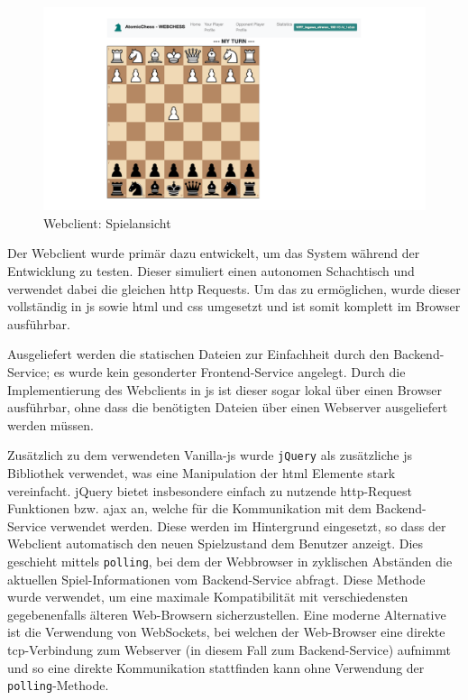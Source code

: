 \begin{figure}
\centering
\includegraphics{images/ATC_webclient.png}
\caption{Webclient: Spielansicht \label{ATC_webclient}}
\end{figure}

Der Webclient wurde primär dazu entwickelt, um das System während der
Entwicklung zu testen. Dieser simuliert einen autonomen Schachtisch und
verwendet dabei die gleichen \gls{http} Requests. Um das zu ermöglichen,
wurde dieser vollständig in \gls{js} sowie \gls{html} und \gls{css}
umgesetzt und ist somit komplett im Browser ausführbar.

Ausgeliefert werden die statischen Dateien zur Einfachheit durch den
Backend-Service; es wurde kein gesonderter Frontend-Service angelegt.
Durch die Implementierung des Webclients in \gls{js} ist dieser sogar
lokal über einen Browser ausführbar, ohne dass die benötigten Dateien
über einen Webserver ausgeliefert werden müssen.

Zusätzlich zu dem verwendeten Vanilla-\gls{js} wurde
\passthrough{\lstinline!jQuery!}\cite{jquery} als zusätzliche
\gls{js} Bibliothek verwendet, was eine Manipulation der \gls{html}
Elemente stark vereinfacht. jQuery bietet insbesondere einfach zu
nutzende \gls{http}-Request Funktionen bzw. \gls{ajax} an, welche für
die Kommunikation mit dem Backend-Service verwendet werden. Diese werden
im Hintergrund eingesetzt, so dass der Webclient automatisch den neuen
Spielzustand dem Benutzer anzeigt. Dies geschieht mittels
\passthrough{\lstinline!polling!}, bei dem der Webbrowser in zyklischen
Abständen die aktuellen Spiel-Informationen vom Backend-Service abfragt.
Diese Methode wurde verwendet, um eine maximale Kompatibilität mit
verschiedensten gegebenenfalls älteren Web-Browsern sicherzustellen.
Eine moderne Alternative ist die Verwendung von WebSockets, bei welchen
der Web-Browser eine direkte \gls{tcp}-Verbindung zum Webserver (in
diesem Fall zum Backend-Service) aufnimmt und so eine direkte
Kommunikation stattfinden kann ohne Verwendung der
\passthrough{\lstinline!polling!}-Methode.

